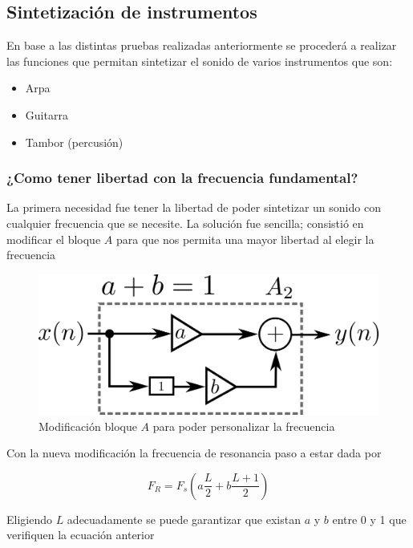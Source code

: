 \documentclass[assd_tp2_main.tex]{subfiles}
\begin{document}
\subsection{Sintetización de instrumentos}

En base a las distintas pruebas realizadas anteriormente se procederá a realizar las funciones que permitan sintetizar el sonido de varios instrumentos que son:
\begin{itemize}
	\item Arpa
	\item Guitarra
	\item Tambor (percusión)
\end{itemize}

\subsubsection{¿Como tener libertad con la frecuencia fundamental?}

La primera necesidad fue tener la libertad de poder sintetizar un sonido con cualquier frecuencia que se necesite. La solución fue sencilla; consistió en modificar el bloque $A$ para que nos permita una mayor libertad al elegir la frecuencia
\begin{figure}[H]
	\begin{center}
	\includegraphics[scale=1]{graficos/bloque4ej5.png}
	\caption{Modificación bloque $A$ para poder personalizar la frecuencia}

	\end{center}
\end{figure}

Con la nueva modificación la frecuencia de resonancia paso a estar dada por

\begin{equation}
	F_R=F_s(a\frac{L}{2}+b\frac{L+1}{2})
\end{equation}

Eligiendo $L$ adecuadamente se puede garantizar que existan $a$ y $b$ entre 0 y 1 que verifiquen la ecuación anterior
\end{document}
